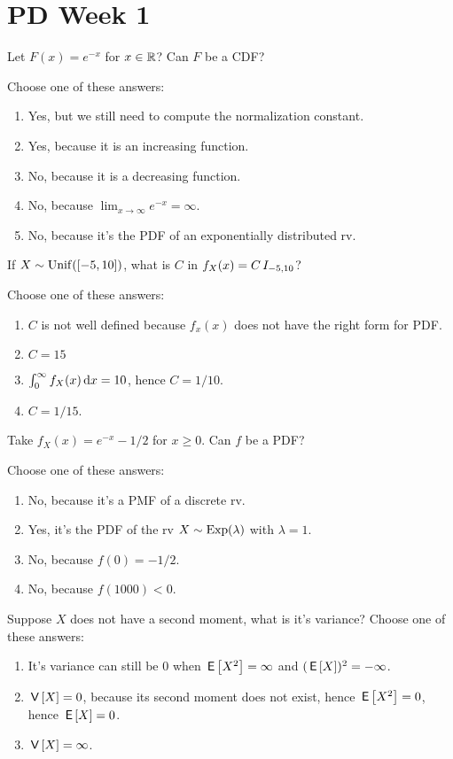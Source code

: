 \documentclass[poll_tutorial_format]{subfiles}
\begin{document}
\section{PD Week 1}

\begin{exercise}
Let $F(x) = e^{-x}$ for $x\in \mathbb{R}$? Can $F$ be a CDF?

Choose one of these answers:
\begin{enumerate}
\item Yes, but we still need to compute the normalization constant.
\item Yes, because it is an increasing function.
\item No, because it is a decreasing function.
\item No, because $\lim_{x\to\infty} e^{-x}=\infty$.
\item No, because it's the PDF of an exponentially distributed rv.
\end{enumerate}
\end{exercise}


\begin{exercise}
If $X\sim  \mathrm{Unif}([-5, 10])$, what is $C$ in $f_{X}(x) = C \,I_{-5, 10}$?

Choose one of these answers:
\begin{enumerate}
\item $C$ is not well defined because $f_{x}(x)$ does not have the right form for PDF.
\item $C=15$
\item $\int_0^{\infty} f_{X}(x) \,\textrm{d}x = 10$, hence $C=1/10$.
\item $C=1/15$.
\end{enumerate}
\end{exercise}

\begin{exercise}
Take $f_X(x) = e^{-x}-1/2$ for $x\geq 0$.  Can $f$ be a PDF?

Choose one of these answers:
\begin{enumerate}
\item No, because it's a PMF of a discrete rv.
\item Yes, it's the PDF of the rv $X\sim\mathrm{Exp}(\lambda)$ with $\lambda = 1$.
\item No, because $f(0)  = -1/2$.
\item No, because $f(1000) < 0$.
\end{enumerate}
\end{exercise}


\begin{exercise}
Suppose $X$ does not have a second moment, what is it's variance?
Choose one of these answers:
\begin{enumerate}
\item It's variance can still be $0$ when $\,\mathsf{E}\left[X^2\right] = \infty$ and $(\,\mathsf{E}\left[X\right])^2=-\infty$.
\item $\,\mathsf{V}\left[X\right]=0$, because its second moment does not exist, hence $\,\mathsf{E}\left[X^2\right]=0$, hence $\,\mathsf{E}\left[X\right]=0$.
\item $\,\mathsf{V}\left[X\right] = \infty$.
\end{enumerate}
\end{exercise}
\end{document}
